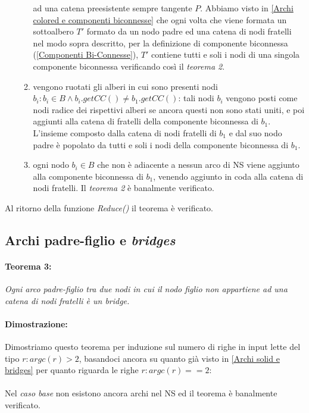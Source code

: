 \documentclass[a4paper,11pt]{report}
\begin{document}
\begin{enumerate}
\begin{enumerate}
ad una catena preesistente sempre tangente
$P$. Abbiamo visto in \ref{Archi colored e componenti biconnesse} che ogni volta che viene formata un sottoalbero $T'$ formato da un nodo
padre ed una catena di nodi fratelli nel modo sopra descritto,
per la definizione di componente biconnessa (\ref{Componenti Bi-Connesse}), $T'$ contiene tutti e soli i nodi di una singola componente
biconnessa verificando così il \emph{teorema 2}.
  \item vengono ruotati gli alberi in cui sono presenti nodi $b_i:b_i\in B\wedge b_i.getCC\left(\right)\neq b_1.getCC\left(\right)$: tali
nodi $b_i$ vengono posti come nodi radice dei rispettivi alberi
se ancora questi non sono stati uniti, e poi aggiunti alla catena di fratelli della componente biconnessa di $b_1$. L'insieme composto dalla
catena di nodi fratelli di $b_1$ e dal suo nodo padre è 
popolato da tutti e soli i nodi della componente biconnessa di $b_1$.
  \item ogni nodo $b_i\in B$ che non è adiacente a nessun arco di NS viene aggiunto alla componente biconnessa di $b_1$, venendo aggiunto in
coda alla catena di nodi fratelli. Il \emph{teorema
2} è banalmente verificato.
  \end{enumerate}
 \end{enumerate}
Al ritorno della funzione \emph{Reduce()} il teorema è verificato.

\subsection{Archi padre-figlio e \emph{bridges}}
\paragraph{Teorema 3:}\emph{Ogni arco padre-figlio tra due nodi in cui il nodo figlio non appartiene ad una catena di nodi fratelli è un
bridge.}
\paragraph{Dimostrazione:} Dimostriamo questo teorema per induzione sul numero di righe in input lette del tipo $r:argc\left(r\right)>2$,
basandoci ancora su quanto già visto in \ref{Archi solid e bridges} per 
quanto riguarda le righe $r:argc\left(r\right)==2$:
\paragraph{}
Nel \emph{caso base} non esistono ancora archi nel NS ed il teorema è banalmente verificato.
\end{document}

